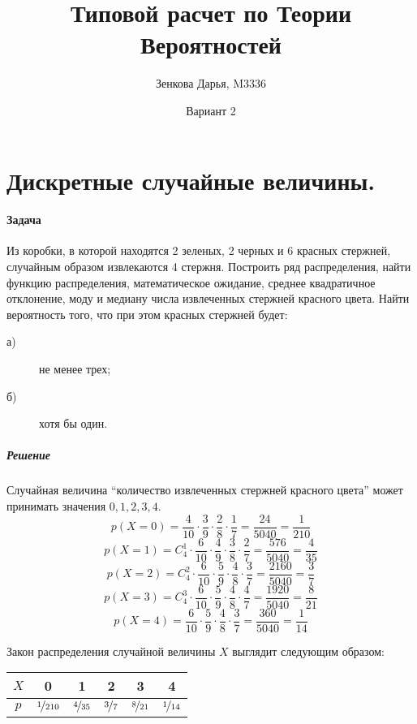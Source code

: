 \documentclass[fleqn, 10pt]{article}
\title{Типовой расчет по Теории Вероятностей}
\author{Зенкова Дарья, M3336}
\date{Вариант 2}
\begin{document}
\maketitle
\newpage
{}

\section{Дискретные случайные величины.}

\paragraph{Задача}
Из коробки, в которой находятся 2 зеленых, 2 черных и 6 красных стержней, случайным образом извлекаются 4 стержня. Построить ряд распределения, найти функцию распределения, математическое ожидание, среднее квадратичное отклонение, моду и медиану числа извлеченных стержней красного цвета. Найти вероятность того, что при этом красных стержней будет:
\begin{description}
\item[а)] не менее трех;
\item[б)] хотя бы один.
\end{description}

\subparagraph{Решение}
Случайная величина ``количество извлеченных стержней красного цвета'' может принимать значения \(0, 1, 2, 3, 4\).
\[p(X = 0) = \frac{4}{10}\cdot\frac{3}{9}\cdot\frac{2}{8}\cdot\frac{1}{7} = \frac{24}{5040} = \frac{1}{210}\]
\[p(X = 1) = C_4^1\cdot\frac{6}{10}\cdot\frac{4}{9}\cdot\frac{3}{8}\cdot\frac{2}{7} = \frac{576}{5040} = \frac{4}{35}\]
\[p(X = 2) = C_4^2\cdot\frac{6}{10}\cdot\frac{5}{9}\cdot\frac{4}{8}\cdot\frac{3}{7} = \frac{2160}{5040} = \frac{3}{7}\]
\[p(X = 3) = C_4^3\cdot\frac{6}{10}\cdot\frac{5}{9}\cdot\frac{4}{8}\cdot\frac{4}{7} = \frac{1920}{5040} = \frac{8}{21}\]
\[p(X = 4) = \frac{6}{10}\cdot\frac{5}{9}\cdot\frac{4}{8}\cdot\frac{3}{7} = \frac{360}{5040} = \frac{1}{14}\]

Закон распределения случайной величины \(X\) выглядит следующим образом:
\begin{center}
\begin{tabular}{ | c | c  | c | c | c | c | }
  \hline
\(X\) & 0 & 1 & 2 & 3 & 4\\ [1ex] \hline
\(p\) & \(\nicefrac{1}{210}\) & \(\nicefrac{4}{35}\) & \(\nicefrac{3}{7}\) & \(\nicefrac{8}{21}\) & \(\nicefrac{1}{14}\) \\ [1ex] \hline
\end{tabular}
\end{center}
\end{document}
